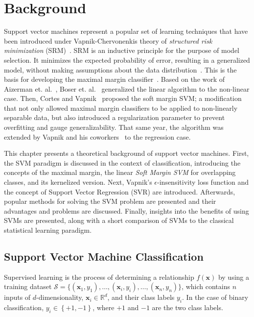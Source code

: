 \documentclass[reqno]{vcuthesis}
\newcommand{\set}[1]{{\left\{#1\right\}}}
\newcommand{\reals}{{\mathbb{R}}}
\numberwithin{equation}{chapter}
\begin{document}
\chapter{Background}\label{chap:background}
Support vector machines represent a popular set of learning techniques that have been introduced under Vapnik-Chervonenkis theory of \textit{structured risk minimization} (SRM)~\cite{boser1992training,Cortes1995,Kecman2001,Schoelkopf2002,Shalev2014}. SRM is an inductive principle for the purpose of model selection. It minimizes the expected probability of error, resulting in a generalized model, without making assumptions about the data distribution~\cite{Shalev2014,vapnik2015uniform}. This is the basis for developing the maximal margin classifier~\cite{vapnik2015uniform}. Based on the work of Aizerman et. al.~\cite{Aizerman67theoretical}, Boser et. al.~\cite{boser1992training} generalized the linear algorithm to the non-linear case. Then, Cortes and Vapnik~\cite{Cortes1995} proposed the soft margin SVM; a modification that not only allowed maximal margin classifiers to be applied to non-linearly separable data, but also introduced a regularization parameter to prevent overfitting and gauge generalizability. That same year, the algorithm was extended by Vapnik and his coworkers~\cite{vapnik2013nature} to the regression case.

This chapter presents a theoretical background of support vector machines. First, the SVM paradigm is discussed in the context of classification, introducing the concepts of the maximal margin, the linear \textit{Soft Margin SVM} for overlapping classes, and its kernelized version. Next, Vapnik's $\epsilon$-insensitivity loss function and the concept of Support Vector Regression (SVR) are introduced. Afterwards, popular methods for solving the SVM problem are presented and their advantages and problems are discussed. Finally, insights into the benefits of using SVMs are presented, along with a short comparison of SVMs to the classical statistical learning paradigm.

\section{Support Vector Machine Classification}
Supervised learning is the process of determining a relationship $f(\bm x)$ by using a training dataset $\mathcal{S} = \{(\bm{x}_1,y_1),\ldots,(\bm{x}_i,y_i),\ldots,(\bm{x}_n,y_n)\}$, which contains $n$ inputs of $d$-dimensionality, $\bm x_i \in \reals^d$, and their class labels $y_i$. In the case of binary classification, $y_i \in \set{+1,-1}$, where $+1$ and $-1$ are the two class labels.
\end{document}
